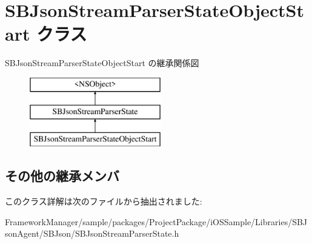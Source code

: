 \hypertarget{interface_s_b_json_stream_parser_state_object_start}{}\section{S\+B\+Json\+Stream\+Parser\+State\+Object\+Start クラス}
\label{interface_s_b_json_stream_parser_state_object_start}
S\+B\+Json\+Stream\+Parser\+State\+Object\+Start の継承関係図\begin{figure}[H]
\begin{center}
\leavevmode
\includegraphics[height=3.000000cm]{interface_s_b_json_stream_parser_state_object_start}
\end{center}
\end{figure}
\subsection*{その他の継承メンバ}


このクラス詳解は次のファイルから抽出されました\+:\begin{DoxyCompactItemize}
\item 
Framework\+Manager/sample/packages/\+Project\+Package/i\+O\+S\+Sample/\+Libraries/\+S\+B\+Json\+Agent/\+S\+B\+Json/S\+B\+Json\+Stream\+Parser\+State.\+h\end{DoxyCompactItemize}
